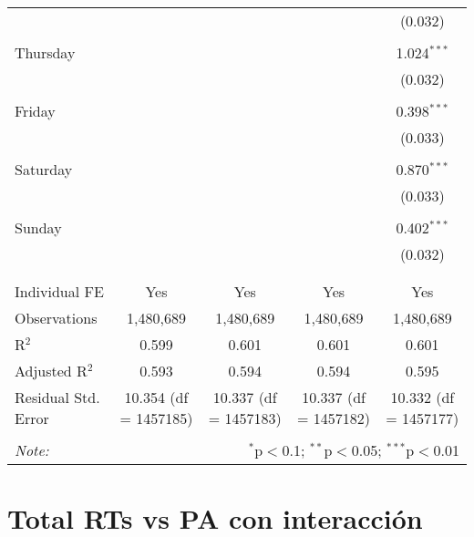\documentclass[
]{article}
\begin{document}
\begin{table}[!htbp]
{\begin{tabular}{@{\extracolsep{5pt}}lcccc}
  &  &  &  & (0.032) \\ 
  & & & & \\ 
 Thursday &  &  &  & 1.024$^{***}$ \\ 
  &  &  &  & (0.032) \\ 
  & & & & \\ 
 Friday &  &  &  & 0.398$^{***}$ \\ 
  &  &  &  & (0.033) \\ 
  & & & & \\ 
 Saturday &  &  &  & 0.870$^{***}$ \\ 
  &  &  &  & (0.033) \\ 
  & & & & \\ 
 Sunday &  &  &  & 0.402$^{***}$ \\ 
  &  &  &  & (0.032) \\ 
  & & & & \\ 
\hline \\[-1.8ex] 
Individual FE & Yes & Yes & Yes & Yes \\ 
Observations & 1,480,689 & 1,480,689 & 1,480,689 & 1,480,689 \\ 
R$^{2}$ & 0.599 & 0.601 & 0.601 & 0.601 \\ 
Adjusted R$^{2}$ & 0.593 & 0.594 & 0.594 & 0.595 \\ 
Residual Std. Error & 10.354 (df = 1457185) & 10.337 (df = 1457183) & 10.337 (df = 1457182) & 10.332 (df = 1457177) \\ 
\hline 
\hline \\[-1.8ex] 
\textit{Note:}  & \multicolumn{4}{r}{$^{*}$p$<$0.1; $^{**}$p$<$0.05; $^{***}$p$<$0.01} \\ 
\end{tabular}
} 
\end{table} 
\newpage
\section{Total RTs vs PA con interacción}
\end{document}
